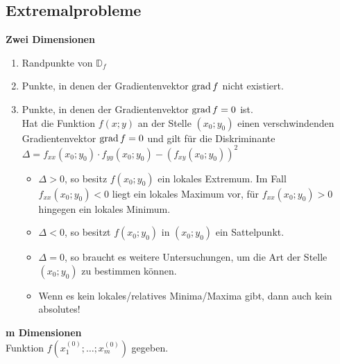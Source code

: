 \subsection{Extremalprobleme}
\textbf{Zwei Dimensionen}\\
\begin{enumerate}
  \item Randpunkte von $\mathbb{D}_f$
  \item Punkte, in denen der Gradientenvektor $\operatorname{grad} f$ nicht existiert. 
  \item Punkte, in denen der Gradientenvektor $\operatorname{grad} f=0$ ist.\\
  Hat die Funktion $f(x;y)$ an der Stelle $(x_0;y_0)$ einen verschwindenden Gradientenvektor $\operatorname{grad} f = 0$ und gilt für die Diskriminante $\Delta = f_{xx}    (x_0;y_0) \cdot f_{yy}(x_0;y_0) -  (f_{xy}(x_0;y_0))^2$
  \begin{itemize}
    \item $\Delta > 0 $, so besitz $f(x_0;y_0)$ ein lokales Extremum. Im Fall $f_{xx}(x_0;y_0) < 0$ liegt ein lokales Maximum vor, für $f_{xx}(x_0;y_0) >       0$ hingegen ein lokales Minimum.
    \item $\Delta < 0 $, so besitzt $f(x_0;y_0)$ in $(x_0;y_0)$ ein Sattelpunkt.
    \item $\Delta = 0 $, so braucht es weitere Untersuchungen, um die Art der Stelle $(x_0;y_0)$ zu bestimmen können.
    \item Wenn es kein lokales/relatives Minima/Maxima gibt, dann auch kein
    absolutes! 
  \end{itemize}
\end{enumerate}
\textbf{m Dimensionen}\\
Funktion $f(x_1^{(0)};\ldots;x_m^{(0)})$ gegeben.  \\
